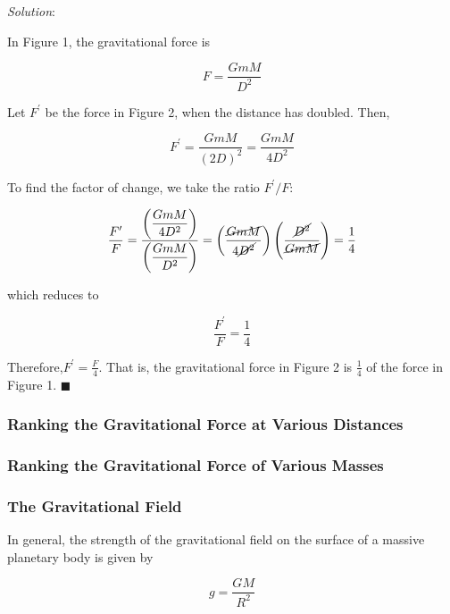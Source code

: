 \documentclass[dvipsnames]{article}
\begin{document}
\textit{Solution}:

In Figure 1, the gravitational force is

\begin{equation*}
    F = \frac{GmM}{D^2}
\end{equation*}

Let $F^\prime$ be the force in Figure 2, when the distance has doubled. Then,

\begin{equation*}
    F^\prime = \frac{G m M}{(2D)^2} = \frac{GmM}{4D^2}
\end{equation*}

To find the factor of change, we take the ratio $F^\prime/F$:

\begin{equation*}
    \frac{F^\prime}{F} = \frac{\left(\displaystyle \frac{GmM}{4D^2}\right)}{\left(\displaystyle \frac{GmM}{D^2}\right)} = \left(\frac{\cancel{GmM}}{4\cancel{D^2}}\right) \left(\frac{\cancel{D^2}}{\cancel{GmM}}\right) = \frac{1}{4}
\end{equation*}

which reduces to

\begin{equation*}
    \frac{F^\prime}{F} = \frac{1}{4}
\end{equation*}

Therefore,$F^\prime = \frac{F}{4}$. That is, the gravitational force in Figure 2 is $\frac{1}{4}$ of the force in Figure 1. \hfill $\blacksquare$

\subsubsection{Ranking the Gravitational Force at Various Distances}

\subsubsection{Ranking the Gravitational Force of Various Masses}

\subsubsection{The Gravitational Field}

In general, the strength of the gravitational field on the surface of a massive planetary body is given by

\begin{equation*}
    g = \frac{GM}{R^2}
\end{equation*}
\end{document}
